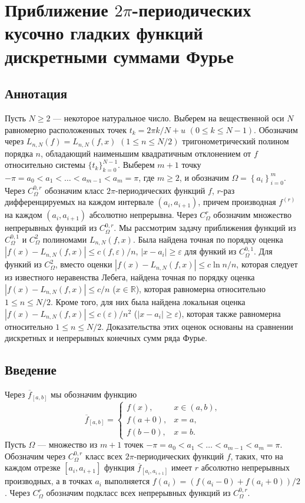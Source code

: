 \section{Приближение $2\pi$-периодических кусочно гладких функций дискретными суммами Фурье}

\subsection{Аннотация}
Пусть $N \geq 2$ --- некоторое натуральное число. Выберем на вещественной оси $N$ равномерно расположенных точек $t_k=2\pi k / N + u$ $(0 \leq k \leq N-1)$.
Обозначим через $L_{n,N}(f)=L_{n,N}(f,x)$ $(1\leq n\leq N/2)$ тригонометрический полином порядка $n$, обладающий наименьшим квадратичным отклонением от $f$ относительно системы $\{t_k\}_{k=0}^{N-1}$. Выберем $m+1$ точку $-\pi=a_{0}<a_{1}<\ldots<a_{m-1}<a_{m}=\pi$, где $m\geq 2$, и обозначим $\Omega=\left\{a_i\right\}_{i=0}^{m}$.
Через $C_{\Omega}^{0,r}$ обозначим класс $2\pi$-периодических функций $f$, $r$-раз дифференцируемых на каждом интервале  $(a_{i},a_{i+1})$, причем
производная $f^{(r)}$ на каждом $(a_{i},a_{i+1})$ абсолютно непрерывна.
Через $C^r_\Omega$ обозначим множество непрерывных функций из $C^{0,r}_\Omega$.
Мы рассмотрим задачу приближения функций из $C_{\Omega}^{0,1}$ и $C_{\Omega}^{2}$ полиномами $L_{n,N}(f,x)$.
Была найдена точная по порядку оценка
$\left|f(x) - L_{n,N}(f,x)\right| \leq c(f,\varepsilon)/n$, $\left|x - a_i\right| \geq \varepsilon$ для функий из $C_{\Omega}^{0,1}$.
Для функий из $C_{\Omega}^{2}$, вместо оценки $\left|f(x)-L_{n,N}(f,x)\right| \leq c\ln n/n$, которая следует из известного неравенства Лебега, найдена точная по порядку оценка $\left|f(x)-L_{n,N}(f,x)\right| \leq c/n$ ($x \in \mathbb{R}$), которая равномерна относительно $1 \leq n \leq N/2$.
Кроме того, для них была найдена локальная оценка $\left|f(x)-L_{n,N}(f,x)\right| \leq c(\varepsilon)/n^2$ ($\left|x - a_i\right| \geq \varepsilon$), которая также равномерна относительно $1 \leq n \leq N/2$.
Доказательства этих оценок основаны на сравнении дискретных и непрерывных конечных сумм ряда Фурье.

\subsection{Введение}
Через $\overline{f}_{[a,b]}$ мы обозначим функцию
\begin{equation*}
	\overline{f}_{[a,b]} =
	\begin{cases}
		f(x), & x \in (a,b), \\
		f(a + 0), & x = a,\\
		f(b - 0), & x = b.
	\end{cases}
\end{equation*}
Пусть $\Omega$ --- множество из $m+1$ точек $-\pi=a_{0}<a_{1}<\ldots<a_{m-1}<a_{m}=\pi$.
Обозначим через $C_\Omega^{0,r}$ класс всех $2\pi$-периодических функций $f$,
таких, что на каждом отрезке $[a_i, a_{i+1}]$ функция $\overline{f}_{[a_i, a_{i+1}]}$ имеет
$r$ абсолютно непрерывных производных, а в точках $a_i$ выполняется
 $f(a_i) = (f(a_i - 0) + f(a_i + 0)) / 2$.
Через $C_\Omega^{r}$ обозначим подкласс всех непрерывных функций из $C_\Omega^{0,r}$.

